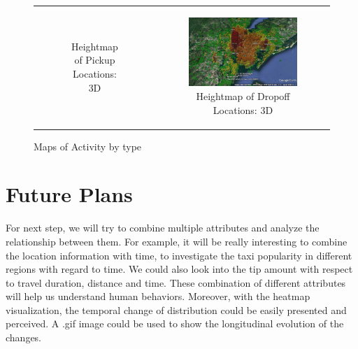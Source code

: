 \documentclass{article}
\begin{document}
\begin{figure}
\begin{tabular}{cc}
\begin{subfigure}{.5\linewidth}
  \caption{Heightmap of Pickup Locations: 3D}
  \label{sub:pu_ne}%
\end{subfigure} &
\begin{subfigure}{.5\linewidth}
  \centering
  \includegraphics[width=.8\linewidth]{dropoff_ne.jpg}
  \caption{Heightmap of Dropoff Locations: 3D}
  \label{sub:do_ne}
\end{subfigure} \\ 
\end{tabular}

\caption{Maps of Activity by type}
\label{fig:heatmap}
\end{figure}

\section{Future Plans}
For next step, we will try to combine multiple attributes and analyze the relationship between them. For example, it will be really interesting to combine the location information with time, to investigate the taxi popularity in different regions with regard to time. We could also look into the tip amount with respect to travel duration, distance and time. These combination of different attributes will help us understand human behaviors. Moreover, with the heatmap visualization, the temporal change of distribution could be easily presented and perceived. A .gif image could be used to show the longitudinal evolution of the changes. 

\vfill

\medskip


\end{document}
